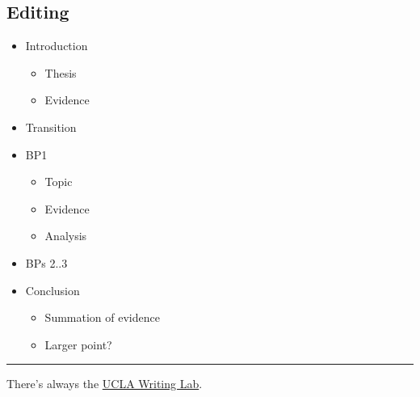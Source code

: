 \documentclass[letterpaper]{article}
\begin{document}
\subsection{Editing}
\label{sec:orgb865e75}
\begin{itemize}
\item Introduction
\begin{itemize}
\item Thesis
\item Evidence
\end{itemize}
\item Transition
\item BP1
\begin{itemize}
\item Topic
\item Evidence
\item Analysis
\end{itemize}
\item BPs 2..3
\item Conclusion
\begin{itemize}
\item Summation of evidence
\item Larger point?
\end{itemize}
\end{itemize}


\noindent\rule{\textwidth}{0.5pt}

There's always the \href{https://wp.ucla.edu/wp-content/uploads/2016/01/UWC\_handouts\_What-How-So-What-Thesis-revised-5-4-15-RZ.pdf}{UCLA Writing Lab}.
\end{document}
